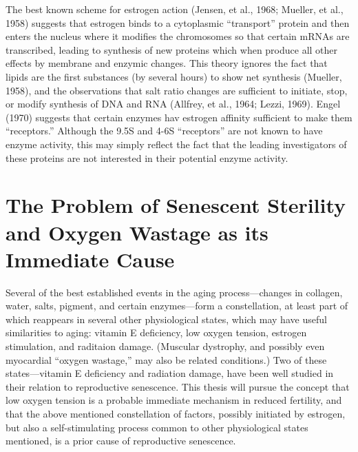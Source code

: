 The best known scheme for estrogen action (Jensen, et al., 1968; Mueller, et al., 1958) suggests that estrogen binds to a cytoplasmic ``transport'' protein and then enters the nucleus where it modifies the chromosomes so that certain mRNAs are transcribed, leading to synthesis of new proteins which when produce all other effects by membrane and
enzymic changes. This theory ignores the fact that lipids are the first substances (by several hours) to show net synthesis (Mueller, 1958), and the observations that salt ratio changes are sufficient to initiate, stop, or modify synthesis of DNA and RNA (Allfrey, et al., 1964; Lezzi, 1969). Engel (1970) suggests that certain enzymes hav estrogen
affinity sufficient to make them ``receptors.'' Although the 9.5S and 4-6S ``receptors'' are not known to have enzyme activity, this may simply reflect the fact that the leading investigators of these proteins are not interested in their potential enzyme activity.

\section[The Problem of Senescent Sterility and Oxygen\\Wastage as its Immediate Cause]{The Problem of Senescent Sterility and Oxygen Wastage as its Immediate Cause}

Several of the best established events in the aging process---changes in collagen, water, salts, pigment, and certain enzymes---form a constellation, at least part of which reappears in several other physiological states, which may have useful similarities to aging: vitamin E deficiency, low oxygen tension, estrogen stimulation, and raditaion damage. (Muscular
dystrophy, and possibly even myocardial ``oxygen wastage,'' may also be related conditions.) Two of these states---vitamin E deficiency and radiation damage, have been well studied in their relation to reproductive senescence. This thesis will pursue the concept that low oxygen tension is a probable immediate mechanism in reduced fertility, and that the
above mentioned constellation of factors, possibly initiated by estrogen, but also a self-stimulating process common to other physiological states mentioned, is a prior cause of reproductive senescence.

